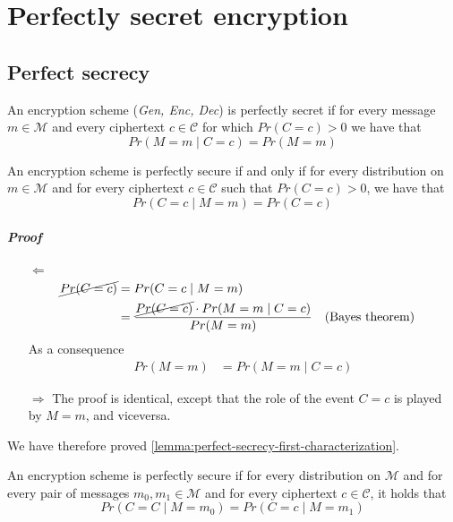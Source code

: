 \documentclass[../main]{subfiles}
\begin{document}
\chapter{Perfectly secret encryption}

\section{Perfect secrecy}

\begin{definition}
    An encryption scheme (\textit{Gen, Enc, Dec}) is perfectly secret if for every message $m \in{} \mathcal{M}$ and every ciphertext $c \in{} \mathcal{C}$ for which $Pr(C=c)>0$ we have that $$Pr(M=m \mid{} C=c) = Pr(M=m)$$
\end{definition}

\begin{lemma}
    \label{lemma:perfect-secrecy-first-characterization}
    An encryption scheme is perfectly secure if and only if for every distribution on $m \in{} \mathcal{M}$ and for every ciphertext $c \in{} \mathcal{C}$ such that $Pr(C=c) > 0$, we have that $$Pr(C=c \mid{} M=m) = Pr(C=c)$$
\end{lemma}

\paragraph{Proof}
    \begin{itemize}
        \item[$\Leftarrow{}$]
            \begin{align*}
                \cancel{Pr(C=c)} &= Pr(C=c \mid M=m) \\
                &= \frac{\cancel{Pr(C=c)} \cdot Pr(M=m \mid C=c)}{Pr(M=m)} &&\text{(Bayes theorem)}
            \end{align*}
            As a consequence
            \begin{align*}
                Pr(M=m) &= Pr(M=m \mid C=c)
            \end{align*}
        \item[$\Rightarrow{}$]
            The proof is identical, except that the role of the event $C=c$ is played by $M=m$, and viceversa.
    \end{itemize}
    We have therefore proved \ref{lemma:perfect-secrecy-first-characterization}.
\begin{lemma}
    \label{lemma:perfect-secrecy-second-characterization}
    An encryption scheme is perfectly secure if for every distribution on $\mathcal{M}$ and for every pair of messages $m_0, m_1 \in{} \mathcal{M}$ and for every ciphertext $c \in{} \mathcal{C}$, it holds that $$Pr(C=C \mid{} M=m_0) = Pr(C=c \mid{} M = m_1)$$
\end{lemma}
\end{document}
